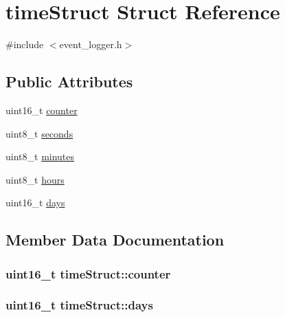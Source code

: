 \hypertarget{structtime_struct}{}\section{time\+Struct Struct Reference}
\label{structtime_struct}


{\ttfamily \#include $<$event\+\_\+logger.\+h$>$}

\subsection*{Public Attributes}
\begin{DoxyCompactItemize}
\item 
uint16\+\_\+t \hyperlink{structtime_struct_a3c87e9cad09c4def65fa1f6aa82f0aec}{counter}
\item 
uint8\+\_\+t \hyperlink{structtime_struct_a6b9621b90a9f7f6cae0341d7e7a5be8b}{seconds}
\item 
uint8\+\_\+t \hyperlink{structtime_struct_a5c2cca19ef619fa7a9fcfcfcd46d895a}{minutes}
\item 
uint8\+\_\+t \hyperlink{structtime_struct_a4e47631be91be8c49dce2a1c0d8789f4}{hours}
\item 
uint16\+\_\+t \hyperlink{structtime_struct_a4464eb87414c4ce8bd7e466f0887866a}{days}
\end{DoxyCompactItemize}


\subsection{Member Data Documentation}
\subsubsection[{\texorpdfstring{counter}{counter}}]{\setlength{\rightskip}{0pt plus 5cm}uint16\+\_\+t time\+Struct\+::counter}\hypertarget{structtime_struct_a3c87e9cad09c4def65fa1f6aa82f0aec}{}\label{structtime_struct_a3c87e9cad09c4def65fa1f6aa82f0aec}
\subsubsection[{\texorpdfstring{days}{days}}]{\setlength{\rightskip}{0pt plus 5cm}uint16\+\_\+t time\+Struct\+::days}\hypertarget{structtime_struct_a4464eb87414c4ce8bd7e466f0887866a}{}\label{structtime_struct_a4464eb87414c4ce8bd7e466f0887866a}
